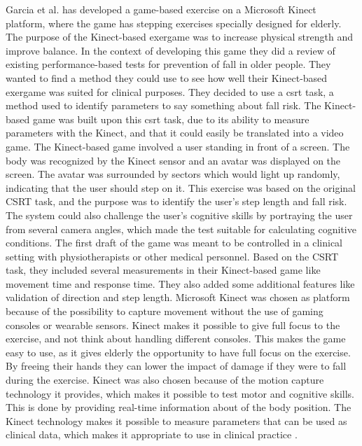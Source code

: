 Garcia et al. \cite{garcia2012exergames} has developed a game-based exercise on a Microsoft Kinect platform, where the game has stepping exercises specially designed for elderly. The purpose of the Kinect-based exergame was to increase physical strength and improve balance. In the context of developing this game they did a review of existing performance-based tests for prevention of fall in older people. They wanted to find a method they could use to see how well their Kinect-based exergame was suited for clinical purposes. They decided to use a \ac{csrt} task, a method used to identify parameters to say something about fall risk.  The Kinect-based game was built upon this \ac{csrt} task, due to its ability to measure parameters with the Kinect, and that it could easily be translated into a video game. The Kinect-based game involved a user standing in front of a screen. The body was recognized by the Kinect sensor and an avatar was displayed on the screen.  The avatar was surrounded by sectors which would light up randomly, indicating that the user should step on it. This exercise was based on the original CSRT task, and the purpose was to identify the user’s step length and fall risk. The system could also challenge the user’s cognitive skills by portraying the user from several camera angles, which made the test suitable for calculating cognitive conditions.  The first draft of the game was meant to be controlled in a clinical setting with physiotherapists or other medical personnel. Based on the CSRT task, they included several measurements in their Kinect-based game like movement time and response time. They also added some additional features like validation of direction and step length.  Microsoft Kinect was chosen as platform because of the possibility to capture movement without the use of gaming consoles or wearable sensors. Kinect makes it possible to give full focus to the exercise, and not think about handling different consoles. This makes the game easy to use, as it gives elderly the opportunity to have full focus on the exercise. By freeing their hands they can lower the impact of damage if they were to fall during the exercise. Kinect was also chosen because of the motion capture technology it provides, which makes it possible to test motor and cognitive skills. This is done by providing real-time information about of the body position. The Kinect technology makes it possible to measure parameters that can be used as clinical data, which makes it appropriate to use in clinical practice \cite{garcia2012exergames}.\\ \\
